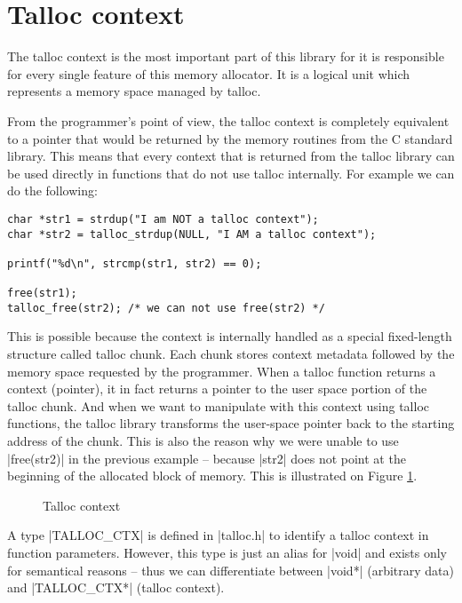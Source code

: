 \section{Talloc context}
\label{talloc:sec:context}

The talloc context is the most important part of this library for it is
responsible for every single feature of this memory allocator. It is a logical
unit which represents a memory space managed by talloc.

From the programmer's point of view, the talloc context is completely
equivalent to a pointer that would be returned by the memory routines from the
C standard library. This means that every context that is returned from the
talloc library can be used directly in functions that do not use talloc
internally. For example we can do the following:

\begin{lstlisting}
char *str1 = strdup("I am NOT a talloc context");
char *str2 = talloc_strdup(NULL, "I AM a talloc context");

printf("%d\n", strcmp(str1, str2) == 0);

free(str1);
talloc_free(str2); /* we can not use free(str2) */
\end{lstlisting}

This is possible because the context is internally handled as a special
fixed-length structure called talloc chunk. Each chunk stores context metadata
followed by the memory space requested by the programmer. When a talloc
function returns a context (pointer), it in fact returns a pointer to the user
space portion of the talloc chunk. And when we want to manipulate with this
context using talloc functions, the talloc library transforms the user-space
pointer back to the starting address of the chunk. This is also the reason why
we were unable to use |free(str2)| in the previous example -- because |str2|
does not point at the beginning of the allocated block of memory. This is
illustrated on Figure \ref{fig:talloc-context}.

\begin{figure}[H]
  \centering
  
  \caption{Talloc context}
  \label{fig:talloc-context}
\end{figure}

A type |TALLOC_CTX| is defined in |talloc.h| to identify a talloc context in
function parameters. However, this type is just an alias for |void| and exists
only for semantical reasons -- thus we can differentiate between |void*|
(arbitrary data) and |TALLOC_CTX*| (talloc context).

